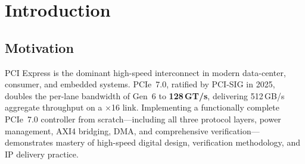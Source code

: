 \documentclass[12pt,a4paper]{report}
\begin{document}
\begin{abstract}
\noindent
This report documents the design, implementation, and verification of a
PCI Express Generation~7 controller IP core (\texttt{pcie\_controller\_top})
implemented in synthesizable SystemVerilog. The IP implements the full
three-layer PCIe stack: a 28-state Link Training and Status State Machine (LTSSM)
with PIPE~6.x adapter, a Data Link Layer with 12-bit sequence numbering,
CRC-32 LCRC, 4096-entry replay buffer and ACK/NAK protocol, credit-based flow
control for Posted/Non-Posted/Completion categories, and a Transaction Layer with
AXI4 bridging, a 4-channel DMA engine, MSI/MSI-X, AER error reporting,
per-tag completion timeout, and an L0s/L1/L2 power management controller.
Version~0.2.0 adds 40+ SVA properties across four assertion modules,
a PIPE-level UVM agent, seven error-injection sequences, LTSSM functional
coverage, CDC synchronizer primitives, Gray-code async FIFOs, UPF power
intent, SymbiYosys formal setups, Synopsys DC synthesis script, IP-XACT
descriptor, and full delivery packaging infrastructure.
The directed testbench achieves 10/10 pass on iverilog. The deliverable
totals 71 files across 18 directories.
\end{abstract}

\tableofcontents
\listoftables
\listoffigures

\chapter{Introduction}

\section{Motivation}

PCI Express is the dominant high-speed interconnect in modern data-center,
consumer, and embedded systems. PCIe~7.0, ratified by PCI-SIG in 2025,
doubles the per-lane bandwidth of Gen~6 to \textbf{128\,GT/s}, delivering
512\,GB/s aggregate throughput on a $\times$16 link. Implementing a
functionally complete PCIe~7.0 controller from scratch—including all three
protocol layers, power management, AXI4 bridging, DMA, and comprehensive
verification—demonstrates mastery of high-speed digital design, verification
methodology, and IP delivery practice.
\end{document}
